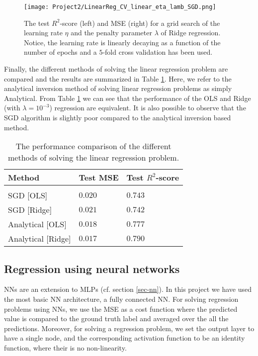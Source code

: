 \documentclass[a4paper]{article}
\begin{document}
\begin{figure}[H]
  \centering
  \texttt{[image: Project2/LinearReg\_CV\_linear\_eta\_lamb\_SGD.png]}
  \caption{The test $R^2$-score (left) and MSE (right) for a grid search of the learning rate $\eta$ and the penalty parameter $\lambda$ of Ridge regression. Notice, the learning rate is linearly decaying as a function of the number of epochs and a $5$-fold cross validation has been used.}
    \label{LinearReg_CV_linear_eta_lamb_SGD}
\end{figure}

Finally, the different methods of solving the linear regression problem are compared and the results are summarized in Table \ref{linreg}. Here, we refer to the analytical inversion method \cite{Jing2020} of solving linear regression problems as simply Analytical. From Table \ref{linreg} we can see that the performance of the OLS and Ridge (with $\lambda=10^{-3}$) regression are equivalent. It is also possible to observe that the SGD algorithm is slightly poor compared to the analytical inversion based method.

\begin{table}[ht]
\begin{center}
  \begin{tabular}{| l | l | l |}
  \hline
    Method &  Test MSE & Test $R^2$-score \\[0.10cm]\hline\hline
     & &  \\
     SGD [OLS] & $0.020$ & $0.743$ \\[0.10cm]
    SGD [Ridge] & $0.021$ & $0.742$\\[0.10cm]
     Analytical [OLS] & $0.018$& $0.777$\\[0.10cm]
     Analytical [Ridge] & $0.017$& $0.790$\\[0.10cm]
     \hline
  \end{tabular}
\end{center}
\caption{The performance comparison of the different methods of solving the linear regression problem.}
\label{linreg}
\end{table}

\subsection{Regression using neural networks} 
NNs are an extension to MLPs (cf. section \ref{sec-nn}). In this project we have used the most basic NN architecture, a fully connected NN. For solving regression problems using NNs, we use the MSE as a cost function where the predicted value is compared to the ground truth label and averaged over the all the predictions. Moreover, for solving a regression problem, we set the output layer to have a single node, and the corresponding activation function to be an identity function, where their is no non-linearity.
\end{document}
